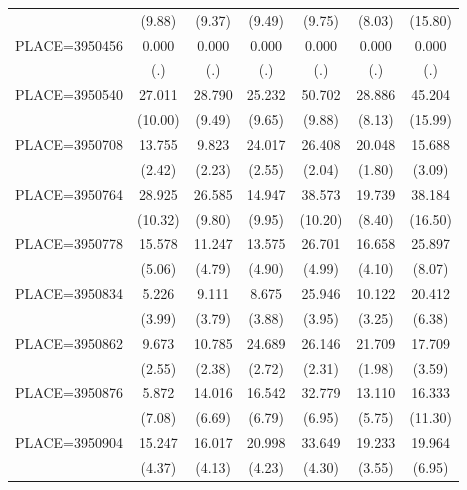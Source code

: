 {\begin{tabular}{l*{6}{c}}
                    &      (9.88)&      (9.37)&      (9.49)&      (9.75)&      (8.03)&     (15.80)\\
PLACE=3950456       &       0.000&       0.000&       0.000&       0.000&       0.000&       0.000\\
                    &         (.)&         (.)&         (.)&         (.)&         (.)&         (.)\\
PLACE=3950540       &      27.011&      28.790&      25.232&      50.702&      28.886&      45.204\\
                    &     (10.00)&      (9.49)&      (9.65)&      (9.88)&      (8.13)&     (15.99)\\
PLACE=3950708       &      13.755&       9.823&      24.017&      26.408&      20.048&      15.688\\
                    &      (2.42)&      (2.23)&      (2.55)&      (2.04)&      (1.80)&      (3.09)\\
PLACE=3950764       &      28.925&      26.585&      14.947&      38.573&      19.739&      38.184\\
                    &     (10.32)&      (9.80)&      (9.95)&     (10.20)&      (8.40)&     (16.50)\\
PLACE=3950778       &      15.578&      11.247&      13.575&      26.701&      16.658&      25.897\\
                    &      (5.06)&      (4.79)&      (4.90)&      (4.99)&      (4.10)&      (8.07)\\
PLACE=3950834       &       5.226&       9.111&       8.675&      25.946&      10.122&      20.412\\
                    &      (3.99)&      (3.79)&      (3.88)&      (3.95)&      (3.25)&      (6.38)\\
PLACE=3950862       &       9.673&      10.785&      24.689&      26.146&      21.709&      17.709\\
                    &      (2.55)&      (2.38)&      (2.72)&      (2.31)&      (1.98)&      (3.59)\\
PLACE=3950876       &       5.872&      14.016&      16.542&      32.779&      13.110&      16.333\\
                    &      (7.08)&      (6.69)&      (6.79)&      (6.95)&      (5.75)&     (11.30)\\
PLACE=3950904       &      15.247&      16.017&      20.998&      33.649&      19.233&      19.964\\
                    &      (4.37)&      (4.13)&      (4.23)&      (4.30)&      (3.55)&      (6.95)\\

\end{tabular}}
